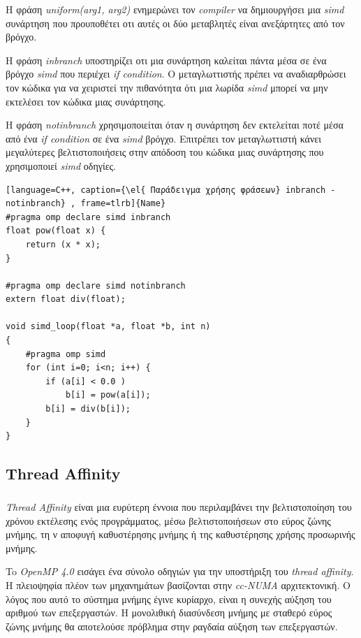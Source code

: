 \documentclass[12pt]{article}
\newcommand{\en}[1]{\foreignlanguage{english}{#1}}
\newcommand{\el}[1]{\selectlanguage{greek}{#1}\selectlanguage{english}}
\begin{document}
Η φράση \emph{\en{uniform(arg1, arg2)}} ενημερώνει τον \emph{\en{compiler}} να δημιουργήσει μια \emph{\en{simd}} συνάρτηση που προυποθέτει οτι αυτές οι δύο μεταβλητές είναι ανεξάρτητες από τον βρόγχο.

Η φράση \emph{\en{inbranch}} υποστηρίζει οτι μια συνάρτηση καλείται πάντα μέσα σε ένα βρόγχο \emph{\en{simd}} που περιέχει \emph{\en{if condition}}. Ο μεταγλωττιστής πρέπει να αναδιαρθρώσει τον κώδικα για να χειριστεί την πιθανότητα ότι μια λωρίδα \emph{\en{simd}} μπορεί να μην εκτελέσει τον κώδικα μιας συνάρτησης.

Η φράση \emph{\en{notinbranch}} χρησιμοποιείται όταν η συνάρτηση δεν εκτελείται ποτέ μέσα από ένα \emph{\en{if condition}} σε ένα \emph{\en{simd}} βρόγχο. Επιτρέπει τον μεταγλωττιστή κάνει μεγαλύτερες βελτιστοποιήσεις στην απόδοση του κώδικα μιας συνάρτησης που χρησιμοποιεί \emph{\en{simd}} οδηγίες.

\begin{lstlisting}[language=C++, caption={\el{ Παράδειγμα χρήσης φράσεων} inbranch - notinbranch} , frame=tlrb]{Name}
#pragma omp declare simd inbranch
float pow(float x) {
	return (x * x);
}

#pragma omp declare simd notinbranch
extern float div(float);

void simd_loop(float *a, float *b, int n)
{
	#pragma omp simd
	for (int i=0; i<n; i++) {
		if (a[i] < 0.0 )
			b[i] = pow(a[i]);
		b[i] = div(b[i]);
	}
}
\end{lstlisting}

\clearpage
\subsection{\en{Thread Affinity}}
\subparagraph{}
\emph{\en{Thread Affinity}} είναι μια ευρύτερη έννοια που περιλαμβάνει την βελτιστοποίηση του χρόνου εκτέλεσης ενός προγράμματος, μέσω βελτιστοποιήσεων στο εύρος ζώνης μνήμης, τη ν αποφυγή καθυστέρησης μνήμης ή της  καθυστέρησης χρήσης προσωρινής μνήμης.

To \emph{\en{OpenMP 4.0}} εισάγει ένα σύνολο οδηγιών για την υποστήριξη του \emph{\en{thread affinity}}\cite{thread_affinity}. Η πλειοψηφία πλέον των μηχανημάτων βασίζονται στην \emph{\en{cc-NUMA}} αρχιτεκτονική. Ο λόγος που αυτό το σύστημα μνήμης έγινε κυρίαρχο, είναι η συνεχής αύξηση του αριθμού των επεξεργαστών. Η μονολιθική διασύνδεση μνήμης με σταθερό εύρος ζώνης μνήμης θα αποτελούσε πρόβλημα στην ραγδαία αύξηση των επεξεργαστών.
\end{document}
